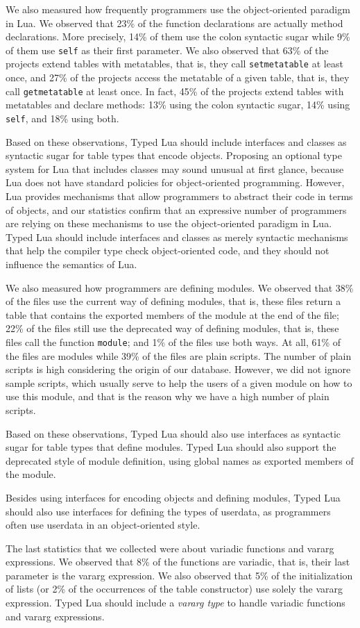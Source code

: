 We also measured how frequently programmers use the object-oriented
paradigm in Lua.
We observed that 23\% of the function declarations are actually
method declarations.
More precisely, 14\% of them use the colon syntactic sugar while
9\% of them use \texttt{self} as their first parameter.
We also observed that 63\% of the projects extend tables with
metatables, that is, they call \texttt{setmetatable} at least once,
and 27\% of the projects access the metatable of a given table,
that is, they call \texttt{getmetatable} at least once.
In fact, 45\% of the projects extend tables with metatables and
declare methods:
13\% using the colon syntactic sugar, 14\% using \texttt{self}, and
18\% using both.

Based on these observations, Typed Lua should include interfaces and
classes as syntactic sugar for table types that encode objects.
Proposing an optional type system for Lua that includes classes may
sound unusual at first glance, because Lua does not have standard
policies for object-oriented programming.
However, Lua provides mechanisms that allow programmers to abstract
their code in terms of objects, and our statistics confirm that
an expressive number of programmers are relying on these mechanisms to
use the object-oriented paradigm in Lua.
Typed Lua should include interfaces and classes as merely syntactic
mechanisms that help the compiler type check object-oriented code,
and they should not influence the semantics of Lua.

We also measured how programmers are defining modules.
We observed that 38\% of the files use the current way of defining
modules, that is, these files return a table that contains the
exported members of the module at the end of the file;
22\% of the files still use the deprecated way of defining modules,
that is, these files call the function \texttt{module};
and 1\% of the files use both ways.
At all, 61\% of the files are modules while 39\% of the files are
plain scripts.
The number of plain scripts is high considering the origin of
our database.
However, we did not ignore sample scripts, which usually serve to
help the users of a given module on how to use this module, and
that is the reason why we have a high number of plain scripts.

Based on these observations, Typed Lua should also use interfaces as
syntactic sugar for table types that define modules.
Typed Lua should also support the deprecated style of module
definition, using global names as exported members of the module.

Besides using interfaces for encoding objects and defining modules,
Typed Lua should also use interfaces for defining the types of
userdata, as programmers often use userdata in an object-oriented
style.

The last statistics that we collected were about variadic functions
and vararg expressions.
We observed that 8\% of the functions are variadic, that is,
their last parameter is the vararg expression.
We also observed that 5\% of the initialization of lists
(or 2\% of the occurrences of the table constructor) use solely the
vararg expression.
Typed Lua should include a \emph{vararg type} to handle variadic
functions and vararg expressions.


